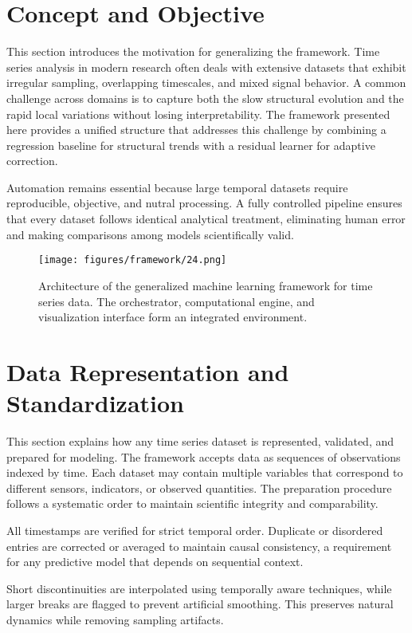 \section{Concept and Objective}

This section introduces the motivation for generalizing the framework. Time series analysis in modern research often deals with extensive datasets that exhibit irregular sampling, overlapping timescales, and mixed signal behavior. A common challenge across domains is to capture both the slow structural evolution and the rapid local variations without losing interpretability. The framework presented here provides a unified structure that addresses this challenge by combining a regression baseline for structural trends with a residual learner for adaptive correction. 

Automation remains essential because large temporal datasets require reproducible, objective, and nutral processing. A fully controlled pipeline ensures that every dataset follows identical analytical treatment, eliminating human error and making comparisons among models scientifically valid.

\begin{figure}[htbp]
\centering
\texttt{[image: figures/framework/24.png]}
\caption{Architecture of the generalized machine learning framework for time series data. The orchestrator, computational engine, and visualization interface form an integrated environment.}
\label{fig:framework_general}
\end{figure}

\section{Data Representation and Standardization}

This section explains how any time series dataset is represented, validated, and prepared for modeling. The framework accepts data as sequences of observations indexed by time. Each dataset may contain multiple variables that correspond to different sensors, indicators, or observed quantities. The preparation procedure follows a systematic order to maintain scientific integrity and comparability.

 All timestamps are verified for strict temporal order. Duplicate or disordered entries are corrected or averaged to maintain causal consistency, a requirement for any predictive model that depends on sequential context.

 Short discontinuities are interpolated using temporally aware techniques, while larger breaks are flagged to prevent artificial smoothing. This preserves natural dynamics while removing sampling artifacts.

